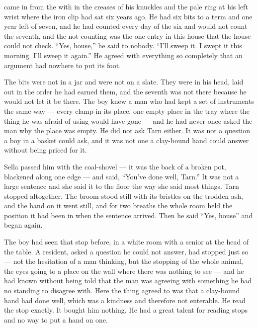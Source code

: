  came in from the  with  in the creases of his knuckles and the pale ring at his left wrist where the iron clip had sat six years ago. He had six bits to a term and one year left of seven, and he had counted every day of the six and would not count the seventh, and the not-counting was the one entry in this house that the house could not check. “Yes, house,” he said to nobody. “I'll sweep it. I swept it this morning. I'll sweep it again.” He agreed with everything so completely that an argument had nowhere to put its foot.

The bits were not in a jar and were not on a slate. They were in his head, laid out in the order he had earned them, and the seventh was not there because he would not let it be there. The boy knew a man who had kept a set of instruments the same way --- every clamp in its place, one empty place in the tray where the thing he was afraid of using would have gone --- and he had never once asked the man why the place was empty. He did not ask Tarn either. It was not a question a boy in a basket could ask, and it was not one a clay-bound hand could answer without being priced for it.

Sella passed him with the coal-shovel --- it was the back of a broken pot, blackened along one edge --- and said, “You've done well, Tarn.” It was not a large sentence and she said it to the floor the way she said most things. Tarn stopped altogether. The broom stood still with its bristles on the trodden ash, and the hand on it went still, and for two breaths the whole room held the position it had been in when the sentence arrived. Then he said “Yes, house” and began again.

The boy had seen that stop before, in a white room with a senior at the head of the table. A resident, asked a question he could not answer, had stopped just so --- not the hesitation of a man thinking, but the stopping of the whole animal, the eyes going to a place on the wall where there was nothing to see --- and he had known without being told that the man was agreeing with something he had no standing to disagree with. Here the thing agreed to was that a clay-bound hand had done well, which was a kindness and therefore not enterable. He read the stop exactly. It bought him nothing. He had a great talent for reading stops and no way to put a hand on one.

\scenebreak

